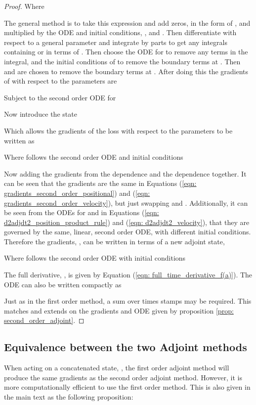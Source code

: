 \documentclass{article}
\theoremstyle{remark}
\theoremstyle{definition}
\begin{document}
\begin{proof}
Where


The general method is to take this expression and add zeros, in the form of ,  and  multiplied by the ODE and initial conditions, ,  and . Then differentiate with respect to a general parameter  and integrate by parts to get any integrals containing  or  in terms of . Then choose the ODE for  to remove any  terms in the integral, and the initial conditions of  to remove the boundary terms at . Then  and  are chosen to remove the boundary terms at . After doing this the gradients of  with respect to the parameters are


Subject to the second order ODE for 


Now introduce the state 


Which allows the gradients of the loss with respect to the parameters to be written as


Where  follows the second order ODE and initial conditions



Now adding the gradients from the  dependence and the  dependence together. It can be seen that the gradients are the same in Equations (\ref{eqn: gradients_second_order_positional}) and (\ref{eqn: gradients_second_order_velocity}), but just swapping  and . Additionally, it can be seen from the ODEs for  and  in Equations (\ref{eqn: d2adjdt2_position_product_rule}) and (\ref{eqn: d2adjdt2_velocity}), that they are governed by the same, linear, second order ODE, with different initial conditions. Therefore the gradients, , can be written in terms of a new adjoint state, 


Where  follows the second order ODE with initial conditions


The full derivative, , is given by Equation (\ref{eqn: full_time_derivative_f(a)}). The ODE can also be written compactly as


Just as in the first order method, a sum over times stamps  may be required. This matches and extends on the gradients and ODE given by proposition \ref{prop: second_order_adjoint}.
\end{proof}

\subsection{Equivalence between the two Adjoint methods}

When acting on a concatenated state, , the first order adjoint method will produce the same gradients as the second order adjoint method. However, it is more computationally efficient to use the first order method. This is also given in the main text as the following proposition:
\end{document}
